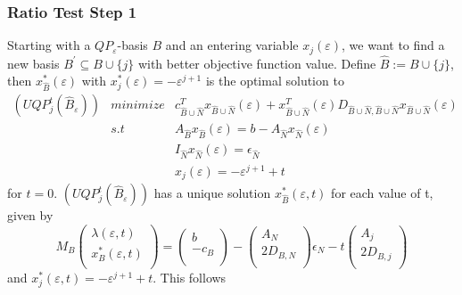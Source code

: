 \documentclass[a4paper]{article}
\newcommand{\xe}[1]{\ensuremath{x_{#1}(\varepsilon)}}
\begin{document}
\subsubsection{Ratio Test Step 1}
Starting with a $QP_{\varepsilon}$-basis $B$ and an entering variable
\xe{j},
we want to find a new basis $B^{\prime} \subseteq B \cup \{j\}$ with
better objective function value.
Define $\hat{B}:=B \cup \{j\}$, then $x_{\hat{B}}^{*}(\varepsilon)$ with
$x_{j}^{*}(\varepsilon)=-\varepsilon^{j+1}$ is the optimal solution to
\begin{eqnarray*}
(UQP_{j}^{t}(\hat{B}_{\varepsilon})) & minimize &
  c_{\hat{B} \cup \hat{N}}^{T}x_{\hat{B} \cup \hat{N}}(\varepsilon)
  + x_{\hat{B} \cup \hat{N}}^{T}(\varepsilon)
  D_{\hat{B} \cup \hat{N},\hat{B} \cup \hat{N}}
  x_{\hat{B} \cup \hat{N}}(\varepsilon)  \\
  & s.t & A_{\hat{B}}x_{\hat{B}}(\varepsilon) =
  b - A_{\hat{N}}x_{\hat{N}}(\varepsilon) \\
  & & I_{\hat{N}}x_{\hat{N}}(\varepsilon) = \epsilon_{\hat{N}} \\
  & & \xe{j} = - \varepsilon^{j+1} + t
\end{eqnarray*}
for $t=0$. $(UQP_{j}^{t}(\hat{B}_{\varepsilon}))$ has a unique solution
$x_{\hat{B}}^{*}(\varepsilon, t)$ for each value of t, given by
\begin{equation}
\label{eq:UQP_j_t_opt_explicit}
M_{B}\left(\begin{array}{c}
              \lambda\left(\varepsilon, t\right) \\
	      \hline
	      x_{B}^{*}\left(\varepsilon, t\right) \\
	    \end{array}
      \right)
=
\left(\begin{array}{c}
         b \\
	 \hline
	 -c_{B} \\
      \end{array}
\right)
-
\left(\begin{array}{c}
         A_{N} \\
	 \hline
	 2D_{B,N} \\
       \end{array}
\right) \epsilon_{N}
-t
\left(\begin{array}{c}
         A_{j} \\
	 \hline
	 2D_{B,j} \\
      \end{array}
\right)
\end{equation}
and $x_{j}^{*}\left(\varepsilon,t\right)= -\varepsilon^{j+1} + t$. This follows
\end{document}
